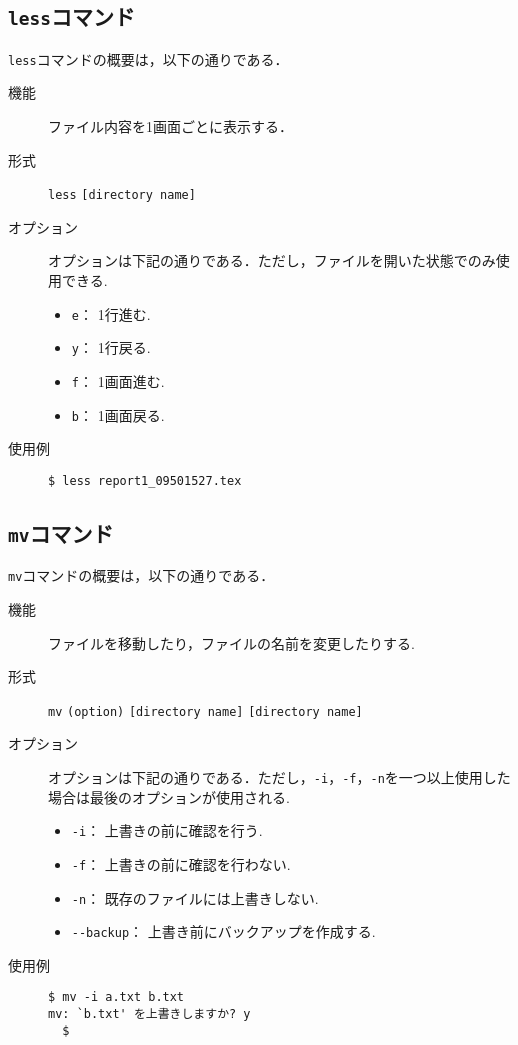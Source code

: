 \documentclass[a4j,11pt]{jarticle}
\begin{document}
\subsection{\texttt{less}コマンド}
\verb|less|コマンドの概要は，以下の通りである．
\begin{description}
  \item[機能] %
    ファイル内容を1画面ごとに表示する．
  \item[形式] %
    \verb|less| \verb|[directory name]|
  \item[オプション] %
オプションは下記の通りである．ただし，ファイルを開いた状態でのみ使用できる.
 \begin{itemize}
      \item \verb|e|：  1行進む.
      \item \verb|y|：  1行戻る.
      \item \verb|f|：  1画面進む. 
      \item \verb|b|：  1画面戻る.
    \end{itemize}
  \item[使用例] %
    \begin{verbatim}
$ less report1_09501527.tex
    \end{verbatim}
\end{description}

\subsection{\texttt{mv}コマンド}
\verb|mv|コマンドの概要は，以下の通りである．
\begin{description}
  \item[機能] %
     ファイルを移動したり，ファイルの名前を変更したりする.
  \item[形式] %
    \verb|mv| \verb|(option)| \verb|[directory name]| \verb|[directory name]|
  \item[オプション] %
オプションは下記の通りである．ただし，\verb|-i|，\verb|-f|，\verb|-n|を一つ以上使用した場合は最後のオプションが使用される.
\begin{itemize}
      \item \verb|-i|：  上書きの前に確認を行う.
      \item \verb|-f|：  上書きの前に確認を行わない.
      \item \verb|-n|：  既存のファイルには上書きしない.
      \item \verb|--backup|：  上書き前にバックアップを作成する.
    \end{itemize}
  \item[使用例] %
    \begin{verbatim}
$ mv -i a.txt b.txt
mv: `b.txt' を上書きしますか? y
  $ 
    \end{verbatim}
\end{description}
\end{document}
